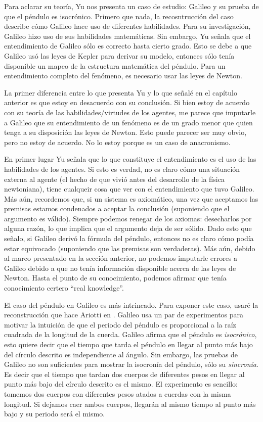 Para aclarar su teoría, Yu nos presenta un caso de estudio: Galileo y su prueba de que el péndulo es isocrónico. Primero que nada, la recosntrucción del caso describe cómo Galileo hace uso de diferentes habilidades. Para su investigación, Galileo hizo uso de sus habilidades matemáticas. Sin embargo, Yu señala que el entendimiento de Galileo sólo es correcto hasta cierto grado. Esto se debe a que Galileo usó las leyes de Kepler para derivar su modelo, entonces sólo tenía disponible un mapeo de la estructura matemática del péndulo. Para un entendimiento completo del fenómeno, es necesario usar las leyes de Newton.

La primer diferencia entre lo que presenta Yu y lo que señalé en el capítulo anterior es que estoy en desacuerdo con su conclusión. Si bien estoy de acuerdo con su teoría de las habilidades/virtudes de los agentes, me parece que imputarle a Galileo que su entendimiento de un fenómeno es de un grado menor que quien tenga a su disposición las leyes de Newton. Esto puede parecer ser muy obvio, pero no estoy de acuerdo. No lo estoy porque es un caso de anacronismo.

En primer lugar Yu señala que lo que constituye el entendimiento es el uso de las habilidades de los agentes. Si esto es verdad, no es claro cómo una situación externa al agente (el hecho de que vivió antes del desarrollo de la física newtoniana), tiene cualqueir cosa que ver con el entendimiento que tuvo Galileo. Más aún, recordemos que, si un sistema es axiomático, una vez que aceptamos las premisas estamos condenados a aceptar la conclusión (suponiendo que el argumento es válido). Siempre podemos renegar de los axiomas: desecharlos por alguna razón, lo que implica que el argumento deja de ser sólido. Dado esto que señalo, si Galileo derivó la fórmula del péndulo, entonces no es claro cómo podía estar equivocado (suponiendo que las premisas son verdaderas). Más aún, debido al marco presentado en la sección anterior, no podemos imputarle errores a Galileo debido a que no tenía información disponible acerca de las leyes de Newton. Hasta el punto de su conocimiento, podemos afirmar que tenía conocimiento certero ``real knowledge''.

El caso del péndulo en Galileo es más intrincado. Para exponer este caso, usaré la reconstrucción que hace Ariotti en \citeyear{Ariotti1968}. Galileo usa un par de experimentos para motivar la intuición de que el periodo del péndulo es proporcional a la raíz cuadrada de la longitud de la cuerda. Galileo afirma que el péndulo es \emph{isocrónico}, esto quiere decir que el tiempo que tarda el péndulo en llegar al punto más bajo del círculo descrito es independiente al ángulo. Sin embargo, las pruebas de Galileo no son suficientes para mostrar la isocronía del péndulo, sólo su \emph{sincronía}. Es decir que el tiempo que tardan dos cuerpos de diferentes pesos en llegar al punto más bajo del círculo descrito es el mismo. El experimento es sencillo: tomemos dos cuerpos con diferentes pesos atados a cuerdas con la misma longitud. Si dejamos caer ambos cuerpos, llegarán al mismo tiempo al punto más bajo y su periodo será el mismo.

